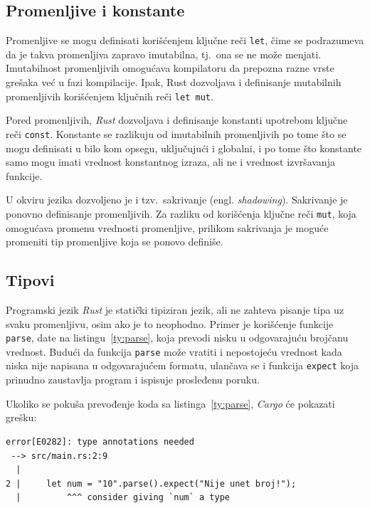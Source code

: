 \documentclass[12pt,oneside]{memoir}
\begin{document}
\subsection{Promenljive i konstante}
Promenljive se mogu definisati korišćenjem ključne reči \texttt{let}, čime se podrazumeva da
je takva promenljiva zapravo imutabilna, tj.\ ona se ne može menjati. Imutabilnost
promenljivih omogućava kompilatoru da prepozna razne vrste grešaka već u fazi kompilacije.
Ipak, Rust dozvoljava i definisanje mutabilnih promenljivih korišćenjem ključnih reči \texttt{let mut}.

Pored promenljivih, \emph{Rust} dozvoljava i definisanje konstanti
upotrebom ključne reči \texttt{const}.
Konstante se razlikuju od imutabilnih promenljivih po tome što se
mogu definisati u bilo kom opsegu, uključujući i globalni, i po
tome što konstante samo mogu imati vrednost konstantnog izraza,
ali ne i vrednost izvršavanja funkcije.

U okviru jezika dozvoljeno je i tzv.\ sakrivanje (engl. \emph{shadowing}).
Sakrivanje je ponovno definisanje promenljivih. Za razliku od
korišćenja ključne reči \texttt{mut}, koja omogućava promenu vrednosti promenljive, prilikom sakrivanja je
moguće promeniti tip promenljive koja se ponovo definiše.

\subsection{Tipovi}
Programski jezik \emph{Rust} je statički tipiziran jezik, ali
ne zahteva pisanje tipa uz svaku promenljivu, osim ako je to
neophodno. Primer je korišćenje funkcije \texttt{parse}, date na listingu~\ref{ty:parse},
koja prevodi nisku u odgovarajuću brojčanu vrednost. Budući da funkcija
\texttt{parse} može vratiti i nepostojeću vrednost kada niska nije napisana
u odgovarajućem formatu, ulančava se i funkcija \texttt{expect} koja
prinudno zaustavlja program i ispisuje prosleđenu poruku.



\noindent
Ukoliko se pokuša prevođenje koda sa listinga~\ref{ty:parse}, \emph{Cargo} će
pokazati grešku:

\begin{lstlisting}[language={}, style=text]
error[E0282]: type annotations needed
 --> src/main.rs:2:9
  |
2 |     let num = "10".parse().expect("Nije unet broj!");
  |         ^^^ consider giving `num` a type
\end{lstlisting}
\end{document}
